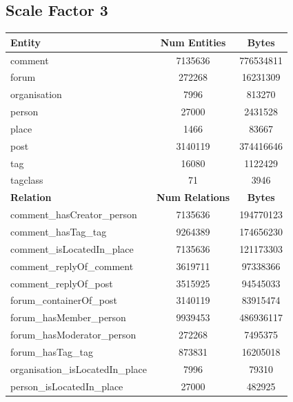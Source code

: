 \subsection{Scale Factor 3}
\begin{table}[H]
    \centering
    \begin{tabular} {| l | c | c |}
        \hline
        \textbf{Entity} & \textbf{Num Entities} & \textbf{Bytes} \\
        \hline
        \hline
        comment & 7135636 & 776534811 \\
        \hline
        forum & 272268 & 16231309 \\
        \hline
        organisation & 7996 & 813270 \\
        \hline
        person & 27000 & 2431528 \\
        \hline
        place & 1466 & 83667 \\
        \hline
        post & 3140119 & 374416646 \\
        \hline
        tag & 16080 & 1122429 \\
        \hline
        tagclass & 71 & 3946 \\
        \hline
        \hline
        \textbf{Relation} & \textbf{Num Relations} & \textbf{Bytes} \\
        \hline
        \hline
        comment\_hasCreator\_person & 7135636 & 194770123 \\
        \hline
        comment\_hasTag\_tag & 9264389 & 174656230 \\
        \hline
        comment\_isLocatedIn\_place & 7135636 & 121173303 \\
        \hline
        comment\_replyOf\_comment & 3619711 & 97338366 \\
        \hline
        comment\_replyOf\_post & 3515925 & 94545033 \\
        \hline
        forum\_containerOf\_post & 3140119 & 83915474 \\
        \hline
        forum\_hasMember\_person & 9939453 & 486936117 \\
        \hline
        forum\_hasModerator\_person & 272268 & 7495375 \\
        \hline
        forum\_hasTag\_tag & 873831 & 16205018 \\
        \hline
        organisation\_isLocatedIn\_place & 7996 & 79310 \\
        \hline
        person\_isLocatedIn\_place & 27000 & 482925 \\
        \hline

\end{tabular}
\end{table}
